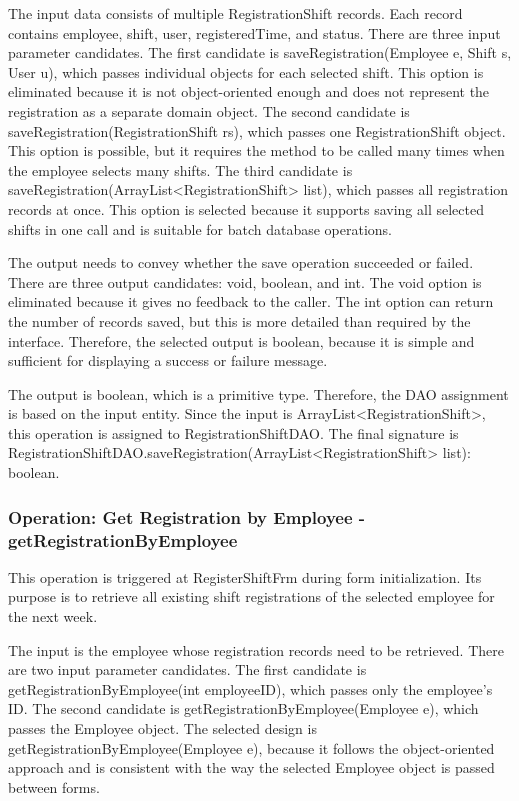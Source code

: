The input data consists of multiple RegistrationShift records. Each record contains employee, shift, user, registeredTime, and status. There are three input parameter candidates. The first candidate is saveRegistration(Employee e, Shift s, User u), which passes individual objects for each selected shift. This option is eliminated because it is not object-oriented enough and does not represent the registration as a separate domain object. The second candidate is saveRegistration(RegistrationShift rs), which passes one RegistrationShift object. This option is possible, but it requires the method to be called many times when the employee selects many shifts. The third candidate is saveRegistration(ArrayList<RegistrationShift> list), which passes all registration records at once. This option is selected because it supports saving all selected shifts in one call and is suitable for batch database operations.

The output needs to convey whether the save operation succeeded or failed. There are three output candidates: void, boolean, and int. The void option is eliminated because it gives no feedback to the caller. The int option can return the number of records saved, but this is more detailed than required by the interface. Therefore, the selected output is boolean, because it is simple and sufficient for displaying a success or failure message.

The output is boolean, which is a primitive type. Therefore, the DAO assignment is based on the input entity. Since the input is ArrayList<RegistrationShift>, this operation is assigned to RegistrationShiftDAO. The final signature is RegistrationShiftDAO.saveRegistration(ArrayList<RegistrationShift> list): boolean.

\subsubsection{Operation: Get Registration by Employee - getRegistrationByEmployee}

This operation is triggered at RegisterShiftFrm during form initialization. Its purpose is to retrieve all existing shift registrations of the selected employee for the next week.

The input is the employee whose registration records need to be retrieved. There are two input parameter candidates. The first candidate is getRegistrationByEmployee(int employeeID), which passes only the employee's ID. The second candidate is getRegistrationByEmployee(Employee e), which passes the Employee object. The selected design is getRegistrationByEmployee(Employee e), because it follows the object-oriented approach and is consistent with the way the selected Employee object is passed between forms.

